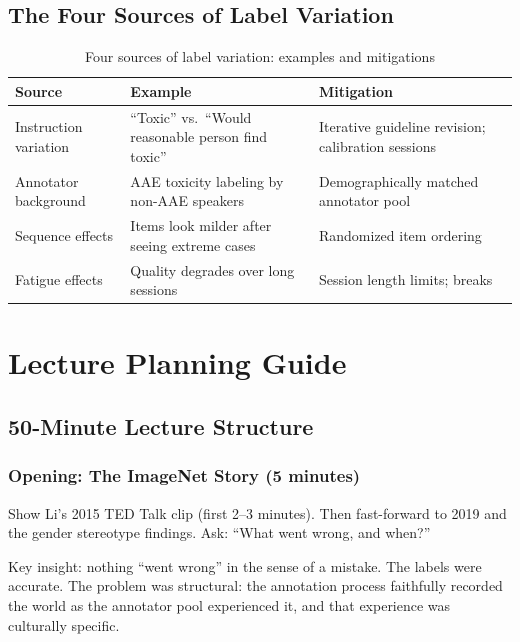 \subsection{The Four Sources of Label Variation}

\begin{table}[htbp]
\caption{Four sources of label variation: examples and mitigations}
\label{tab:label-variation-ch07}
\centering
\begin{tabular}{@{}p{3cm}p{4cm}p{4cm}@{}}
\toprule
\textbf{Source} & \textbf{Example} & \textbf{Mitigation} \\
\midrule
Instruction variation & ``Toxic'' vs.\ ``Would reasonable person find toxic'' & Iterative guideline revision; calibration sessions \\
Annotator background & AAE toxicity labeling by non-AAE speakers & Demographically matched annotator pool \\
Sequence effects & Items look milder after seeing extreme cases & Randomized item ordering \\
Fatigue effects & Quality degrades over long sessions & Session length limits; breaks \\
\bottomrule
\end{tabular}
\end{table}

\section{Lecture Planning Guide}

\subsection{50-Minute Lecture Structure}

\subsubsection{Opening: The ImageNet Story (5 minutes)}

Show Li's 2015 TED Talk clip (first 2--3 minutes). Then fast-forward to 2019 and the gender stereotype findings. Ask: ``What went wrong, and when?''

Key insight: nothing ``went wrong'' in the sense of a mistake. The labels were accurate. The problem was structural: the annotation process faithfully recorded the world as the annotator pool experienced it, and that experience was culturally specific.

